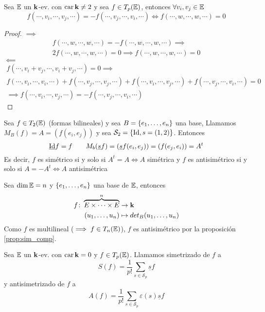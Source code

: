\begin{prop}
    Sea $\mathbb{E}$ un $\mathbf{k}$-ev. con $\operatorname{car} \mathbf{k} \neq 2$ y sea $f \in T_p(\mathbb{E})$, entonces $\forall v_i, v_j \in \mathbb{E}$
    \[
        f(\cdots, v_i, \cdots, v_j, \cdots) = -f(\cdots,v_j,\cdots,v_i,\cdots) \iff
        f(\cdots, w, \cdots, w, \cdots) = 0
    \]
\end{prop}
\begin{proof}
    $\implies$
    \begin{gather*}
        f(\cdots,w,\cdots,w,\cdots) = - f(\cdots,w,\cdots,w,\cdots) \implies \\
        2f(\cdots,w,\cdots,w,\cdots) = 0 \implies f(\cdots,w,\cdots,w,\cdots) = 0
    \end{gather*}
    $\impliedby$
    \begin{gather*}
        f(\cdots, v_i+v_j, \cdots, v_i+v_j, \cdots) = 0 \implies \\
        f(\cdots,v_i,\cdots,v_i,\cdots) + f(\cdots,v_j,\cdots,v_j,\cdots) +
        f(\cdots,v_i,\cdots,v_j,\cdots) + f(\cdots,v_j,\cdots,v_i,\cdots) = 0 \\
        \implies f(\cdots,v_i,\cdots,v_j,\cdots) = -f(\cdots,v_j,\cdots,v_i,\cdots)
    \end{gather*}
\end{proof}
\begin{example}
    Sea $f \in T_2(\mathbb{E})$ (formas bilineales) y sea $B = \left\{e_1,\dots,e_n\right\}$ una base,
    Llamamos $M_B(f) = A = \left( f(e_i,e_j) \right)$ y sea $\mathcal{S}_2 = \left\{\operatorname{Id}, s=(1,2)\right\}$.
    Entonces
    \[
        \underline{\operatorname{Id}}f = f \qquad M_b(\underline{s}f)= \left( \underline{s}f(e_i,e_j) \right)
        = \left( f(e_j,e_i) \right) = A^t
    \]
    Es decir, $f$ es simétrico si y solo si $A^t = A \iff A$ simétrica y $f$ es
    antisimétrico si y solo si $A = -A^t \iff A$ antisimétrica
\end{example}
\begin{example}
    Sea $\dim \mathbb{E} = n$ y $\left\{e_1,\dots,e_n\right\}$ una base de $\mathbb{E}$, entonces
    \[
        \begin{aligned}
            f \colon \overbrace{E \times \cdots \times E}^n &\to \mathbf{k} \\
            (u_1,\dots,u_n) &\mapsto det_B(u_1,\dots,u_n)
        \end{aligned}
    \]
    Como $f$ es multilineal ($\implies f \in T_n(\mathbb{E})$), $f$ es antisimétrico
    por la proposición \ref{prop:sim_comp}.
\end{example}
\begin{defi}
    Sea $\mathbb{E}$ un $\mathbf{k}$-ev. con $\operatorname{car} \mathbf{k} = 0$ y $f \in T_p(\mathbb{E})$. Llamamos simetrizado de $f$ a
    \[
        S(f) = \frac{1}{p!}\sum_{s \in \mathcal{S}_p} \underline{s}f
    \]
    y antisimetrizado de $f$ a
    \[
        A(f) = \frac{1}{p!}\sum_{s \in \mathcal{S}_p} \varepsilon(s)\underline{s}f
    \]
\end{defi}
